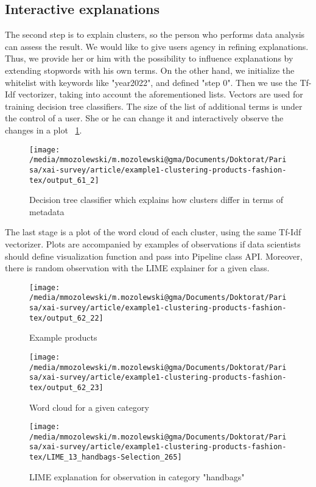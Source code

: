 \documentclass[
 twocolumn,
]{ceurart}
\begin{document}
\subsection{Interactive explanations}
The second step is to explain clusters, so the person who performs data analysis can assess the result.
We would like to give users agency in refining explanations.
Thus, we provide her or him with the possibility to influence explanations by extending stopwords with his own terms.
On the other hand, we initialize the whitelist with keywords like "year2022", and defined "step 0".
Then we use the Tf-Idf vectorizer, taking into account the aforementioned lists.
Vectors are used for training decision tree classifiers.
The size of the list of additional terms is under the control of a user.
She or he can change it and interactively observe the changes in a plot ~\ref{fig:decision_tree}.
\begin{figure}[h!]
  \centering
  \texttt{[image: /media/mmozolewski/m.mozolewski@gma/Documents/Doktorat/Parisa/xai-survey/article/example1-clustering-products-fashion-tex/output\_61\_2]}
  \caption{Decision tree classifier which explains how clusters differ in terms of metadata}
  \label{fig:decision_tree}
\end{figure}
The last stage is a plot of the word cloud of each cluster, using the same Tf-Idf vectorizer.
Plots are accompanied by examples of observations if data scientists should define visualization function and pass into Pipeline class API.
Moreover, there is random observation with the LIME explainer for a given class.
\begin{figure}[h!]
  \centering
  \texttt{[image: /media/mmozolewski/m.mozolewski@gma/Documents/Doktorat/Parisa/xai-survey/article/example1-clustering-products-fashion-tex/output\_62\_22]}
  \caption{Example products}
  \label{fig:example_products}
\end{figure}
\begin{figure}[h!]
  \centering
  \texttt{[image: /media/mmozolewski/m.mozolewski@gma/Documents/Doktorat/Parisa/xai-survey/article/example1-clustering-products-fashion-tex/output\_62\_23]}
  \caption{Word cloud for a given category}
  \label{fig:wordcloud}
\end{figure}
\begin{figure}[h!]
  \centering
  \texttt{[image: /media/mmozolewski/m.mozolewski@gma/Documents/Doktorat/Parisa/xai-survey/article/example1-clustering-products-fashion-tex/LIME\_13\_handbags-Selection\_265]}
  \caption{LIME explanation for observation in category "handbags"}
  \label{fig:lime}
\end{figure}
\end{document}
